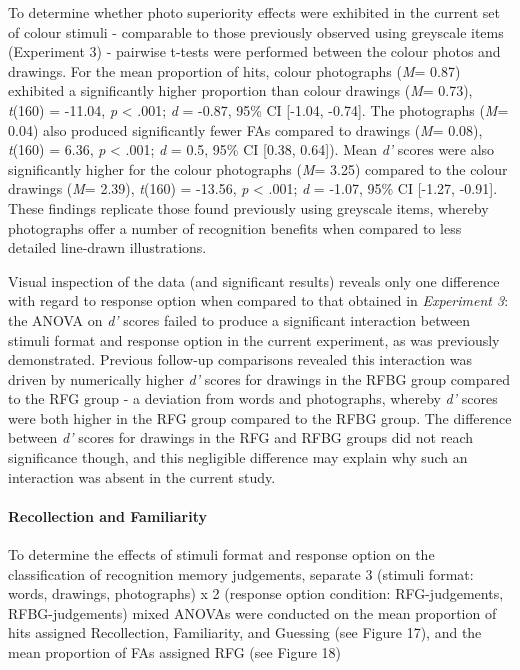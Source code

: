 \documentclass[
  11pt,
]{article}
\begin{document}
To determine whether photo superiority effects were exhibited in the
current set of colour stimuli - comparable to those previously observed
using greyscale items (Experiment 3) - pairwise t-tests were performed
between the colour photos and drawings. For the mean proportion of hits,
colour photographs (\emph{M}= 0.87) exhibited a significantly higher
proportion than colour drawings (\emph{M}= 0.73), \emph{t}(160) =
-11.04, \emph{p} \textless{} .001; \emph{d} = -0.87, 95\% CI {[}-1.04,
-0.74{]}. The photographs (\emph{M}= 0.04) also produced significantly
fewer FAs compared to drawings (\emph{M}= 0.08), \emph{t}(160) = 6.36,
\emph{p} \textless{} .001; \emph{d} = 0.5, 95\% CI {[}0.38, 0.64{]}).
Mean \emph{d'} scores were also significantly higher for the colour
photographs (\emph{M}= 3.25) compared to the colour drawings (\emph{M}=
2.39), \emph{t}(160) = -13.56, \emph{p} \textless{} .001; \emph{d} =
-1.07, 95\% CI {[}-1.27, -0.91{]}. These findings replicate those found
previously using greyscale items, whereby photographs offer a number of
recognition benefits when compared to less detailed line-drawn
illustrations.

Visual inspection of the data (and significant results) reveals only one
difference with regard to response option when compared to that obtained
in \emph{Experiment 3}: the ANOVA on \emph{d'} scores failed to produce
a significant interaction between stimuli format and response option in
the current experiment, as was previously demonstrated. Previous
follow-up comparisons revealed this interaction was driven by
numerically higher \emph{d'} scores for drawings in the RFBG group
compared to the RFG group - a deviation from words and photographs,
whereby \emph{d'} scores were both higher in the RFG group compared to
the RFBG group. The difference between \emph{d'} scores for drawings in
the RFG and RFBG groups did not reach significance though, and this
negligible difference may explain why such an interaction was absent in
the current study.

\hypertarget{recollection-and-familiarity-1}{%
\paragraph{Recollection and
Familiarity}\label{recollection-and-familiarity-1}}

\hfill\break To determine the effects of stimuli format and response
option on the classification of recognition memory judgements, separate
3 (stimuli format: words, drawings, photographs) x 2 (response option
condition: RFG-judgements, RFBG-judgements) mixed ANOVAs were conducted
on the mean proportion of hits assigned Recollection, Familiarity, and
Guessing (see Figure 17), and the mean proportion of FAs assigned RFG
(see Figure 18)
\end{document}
